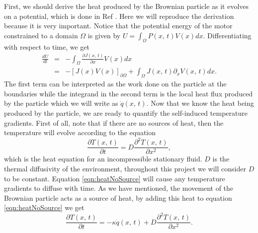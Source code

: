 First, we should derive the heat produced by the Brownian particle as it evolves on a potential, which is done in Ref \cite{M.W.Jack2016}. Here we will reproduce the derivation because it is very important. Notice that the potential energy of the motor constrained to a domain $\Omega$ is given by $U = \int_\Omega P(x, \, t) V(x) dx$. Differentiating with respect to time, we get
\begin{eqnarray}
\frac{d U}{d t} &=& -\int_\Omega \frac{\partial J(x, \, t)}{\partial x} V(x) dx \\
		        &=& -[J(x) V(x)]_{\partial \Omega} + \int_\Omega J(x, \, t) \partial_x V(x, \, t) dx.
\end{eqnarray}
The first term can be interpreted as the work done on the particle at the boundaries while the integrand in the second term is the local heat flux produced by the particle which we will write as $\dot{q}(x, \, t)$. Now that we know the heat being produced by the particle, we are ready to quantify the self-induced temperature gradients. First of all, note that if there are no sources of heat, then the temperature will evolve according to the equation
\begin{equation}
\frac{\partial T(x, \, t)}{\partial t} = D\frac{\partial^2 T(x, \, t)}{\partial x^2}, \label{eqn:heatNoSource}
\end{equation} 
which is the heat equation for an incompressible stationary fluid. $D$ is the thermal diffusivity of the environment, throughout this project we will consider $D$ to be constant. Equation \ref{eqn:heatNoSource} will cause any temperature gradients to diffuse with time. As we have mentioned, the movement of the Brownian particle acts as a source of heat, by adding this heat to equation \ref{eqn:heatNoSource} we get
\begin{equation}
\frac{\partial T(x, \, t)}{\partial t} = -\kappa \dot{q}(x, \, t) + D \frac{\partial^2 T(x, \, t)}{\partial x^2}. \label{eqn:tmpHeat}
\end{equation}


